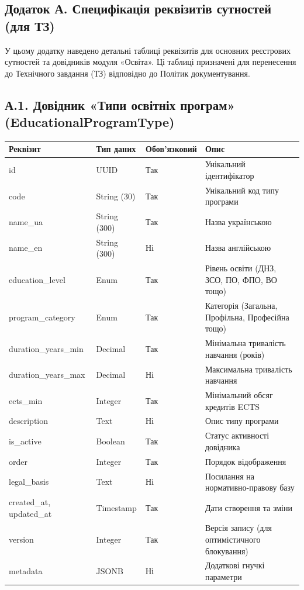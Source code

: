 \documentclass{article}
\begin{document}
\newpage
\begin{appendix}

\section{Додаток А. Специфікація реквізитів сутностей (для ТЗ)}
У цьому додатку наведено детальні таблиці реквізитів для основних реєстрових сутностей та довідників модуля «Освіта». Ці таблиці призначені для перенесення до Технічного завдання (ТЗ) відповідно до Політик документування.

\subsection{А.1. Довідник «Типи освітніх програм» (EducationalProgramType)}
\begin{longtable}{p{3.5cm}p{3cm}p{2cm}p{5.5cm}}
\toprule
\textbf{Реквізит} & \textbf{Тип даних} & \textbf{Обов'язковий} & \textbf{Опис} \\
\midrule
id & UUID & Так & Унікальний ідентифікатор \\
code & String (30) & Так & Унікальний код типу програми \\
name\_ua & String (300) & Так & Назва українською \\
name\_en & String (300) & Ні & Назва англійською \\
education\_level & Enum & Так & Рівень освіти (ДНЗ, ЗСО, ПО, ФПО, ВО тощо) \\
program\_category & Enum & Так & Категорія (Загальна, Профільна, Професійна тощо) \\
duration\_years\_min & Decimal & Так & Мінімальна тривалість навчання (років) \\
duration\_years\_max & Decimal & Ні & Максимальна тривалість навчання \\
ects\_min & Integer & Так & Мінімальний обсяг кредитів ECTS \\
description & Text & Ні & Опис типу програми \\
is\_active & Boolean & Так & Статус активності довідника \\
order & Integer & Так & Порядок відображення \\
legal\_basis & Text & Ні & Посилання на нормативно-правову базу \\
created\_at, updated\_at & Timestamp & Так & Дати створення та зміни \\
version & Integer & Так & Версія запису (для оптимістичного блокування) \\
metadata & JSONB & Ні & Додаткові гнучкі параметри \\
\bottomrule
\end{longtable}


\end{appendix}
\end{document}
